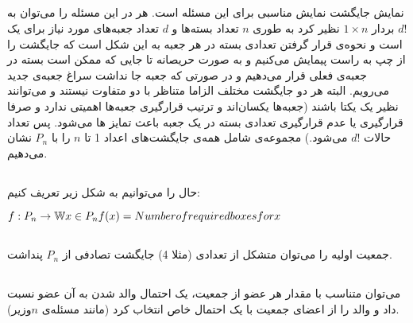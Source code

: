 \documentclass{article}
\begin{document}
\subsection{}
نمایش جایگشت نمایش مناسبی برای این مسئله است. هر  در این مسئله را می‌توان به $d!$ بردار
$1 \times n$
نظیر کرد به طوری $n$ تعداد بسته‌ها و $d$ تعداد جعبه‌های مورد نیاز برای یک   است و نحوه‌ی قرار گرفتن تعدادی بسته در هر جعبه به این شکل است که جایگشت را از چپ به راست پیمایش می‌کنیم و به صورت حریصانه تا جایی که ممکن است بسته در جعبه‌ی فعلی قرار می‌دهیم و در صورتی که جعبه جا نداشت سراغ جعبه‌ی جدید می‌رویم. البته هر دو جایگشت مختلف الزاما متناظر با دو  متفاوت نیستند و می‌توانند نظیر یک  یکتا باشند (جعبه‌ها یکسان‌اند و ترتیب قرارگیری جعبه‌ها اهمیتی ندارد و صرفا قرارگیری یا عدم قرارگیری تعدادی بسته در یک جعبه باعث تمایز ها می‌شود. پس تعداد حالات $d!$ می‌شود.)
\newline
مجموعه‌ی شامل همه‌ی جایگشت‌های اعداد 1 تا $n$ را با $P_{n}$ نشان می‌دهیم.
\subsection{}
حال  را می‌توانیم به شکل زیر تعریف کنیم:
\begin{latin}
$
\newline
f: P_{n} \to \mathbb{W}
\newline
x \in P_{n}
\newline
f(x) = Number \space of \space required \space boxes \space for \space x
$
\end{latin}


\subsection{}
جمعیت اولیه را می‌توان متشکل از تعدادی (مثلا 4) جایگشت تصادفی از $P_{n}$ پنداشت.
\subsection{}
می‌توان متناسب با مقدار  هر عضو از جمعیت، یک احتمال والد شدن به آن عضو نسبت داد و والد را از اعضای جمعیت با یک احتمال خاص انتخاب کرد (مانند مسئله‌ی $n$وزیر).
\subsection{}
\end{document}
